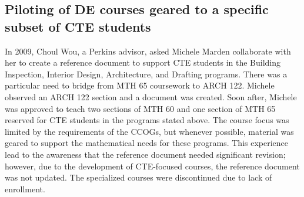 \subsection{Piloting of DE courses geared to a specific subset of CTE students}
In 2009, Choul Wou, a Perkins advisor, asked Michele Marden collaborate with her to create a reference document to support CTE students in the Building Inspection, Interior Design, Architecture, and Drafting programs. There was a particular need to bridge from MTH 65 coursework to ARCH 122. Michele observed an ARCH 122 section and a document was created. Soon after, Michele was approved to teach two sections of MTH 60 and one section of MTH 65 reserved for CTE students in the programs stated above. The course focus was limited by the requirements of the CCOGs, but whenever possible, material was geared to support the mathematical needs for these programs. This experience lead to the awareness that the reference document needed significant revision; however, due to the development of CTE-focused courses, the reference document was not updated. The specialized courses were discontinued due to lack of enrollment.
